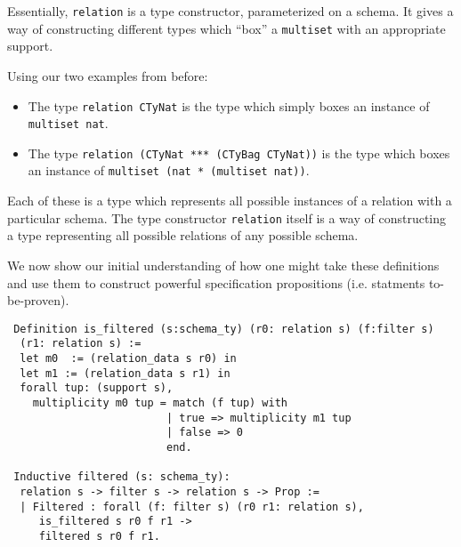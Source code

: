 Essentially, \texttt{relation} is a type constructor, parameterized on a schema. It gives a way of constructing different types which ``box'' a \texttt{multiset} with an appropriate support.

Using our two examples from before:

\begin{itemize}
  \item The type \texttt{relation CTyNat} is the type which simply boxes an
        instance of \texttt{multiset nat}.
  \item The type \texttt{relation (CTyNat *** (CTyBag CTyNat))} is the type
        which boxes an instance of \texttt{multiset (nat * (multiset nat))}.
\end{itemize}

Each of these is a type which represents all possible instances of a relation with a particular schema. The type constructor \texttt{relation} itself is a way of constructing a type representing all possible relations of any possible schema.

We now show our initial understanding of how one might take these definitions and use them to construct powerful specification propositions (i.e. statments to-be-proven).


\begin{lstlisting}
 Definition is_filtered (s:schema_ty) (r0: relation s) (f:filter s)
  (r1: relation s) :=
  let m0  := (relation_data s r0) in
  let m1 := (relation_data s r1) in
  forall tup: (support s),
    multiplicity m0 tup = match (f tup) with
                         | true => multiplicity m1 tup
                         | false => 0
                         end.

 Inductive filtered (s: schema_ty):
  relation s -> filter s -> relation s -> Prop :=
  | Filtered : forall (f: filter s) (r0 r1: relation s),
     is_filtered s r0 f r1 ->
     filtered s r0 f r1.
\end{lstlisting}
